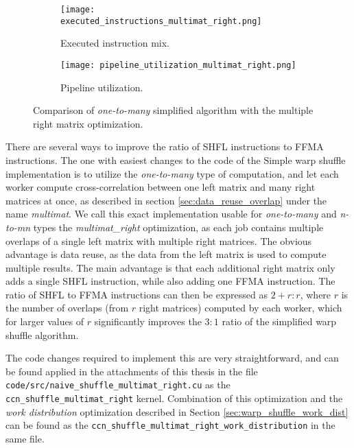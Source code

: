 \begin{figure}[ht]
	\centering	
	\begin{subfigure}{\textwidth}
		\centering
		\texttt{[image: executed\_instructions\_multimat\_right.png]}
		\caption{Executed instruction mix.}
		\label{fig:executed_instructions_multimat_right}
	\end{subfigure}
	\hfill
	\begin{subfigure}{\textwidth}
		\centering
		\texttt{[image: pipeline\_utilization\_multimat\_right.png]}
		\caption{Pipeline utilization.}
		\label{fig:pipeline_utilization_multimat_right}
	\end{subfigure}
	
	\caption{Comparison of \textit{one-to-many} simplified algorithm with the multiple right matrix optimization.}
	\label{fig:multimat_right_profiling}
\end{figure}

There are several ways to improve the ratio of SHFL instructions to FFMA instructions. The one with easiest changes to the code of the Simple warp shuffle implementation is to utilize the \textit{one-to-many} type of computation, and let each worker compute cross-correlation between one left matrix and many right matrices at once, as described in section \ref{sec:data_reuse_overlap} under the name \textit{multimat}. We call this exact implementation usable for \textit{one-to-many} and \textit{n-to-mn} types the \textit{multimat\_right} optimization, as each job contains multiple overlaps of a single left matrix with multiple right matrices. The obvious advantage is data reuse, as the data from the left matrix is used to compute multiple results. The main advantage is that each additional right matrix only adds a single SHFL instruction, while also adding one FFMA instruction. The ratio of SHFL to FFMA instructions can then be expressed as $2 + r : r$, where $r$ is the number of overlaps (from $r$ right matrices) computed by each worker, which for larger values of $r$ significantly improves the $3:1$ ratio of the simplified warp shuffle algorithm.


The code changes required to implement this are very straightforward, and can be found applied in the attachments of this thesis in the file \texttt{code/src/naive\_shuffle\_multimat\_right.cu} as the \texttt{ccn\_shuffle\_multimat\_right} kernel. Combination of this optimization and the \textit{work distribution} optimization described in Section \ref{sec:warp_shuffle_work_dist} can be found as the \texttt{ccn\_shuffle\_multimat\_right\_work\_distribution} in the same file.


